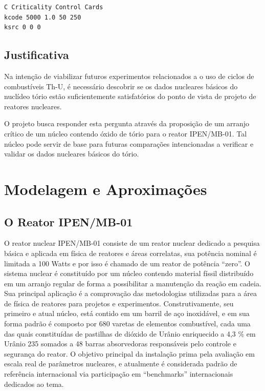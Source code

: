 \documentclass[
	12pt,				%
	openany,			%
	twoside,			%
	a4paper,			%
	english,			%
	french,				%
	spanish,			%
	brazil				%
	]{abntex2}
\begin{document}
\begin{lstlisting}
C Criticality Control Cards  
kcode 5000 1.0 50 250  
ksrc 0 0 0
\end{lstlisting}

\newpage
\section{Justificativa}

Na intenção de viabilizar futuros experimentos relacionados a o uso de ciclos de combustíveis Th-U, é necessário descobrir se os dados nucleares básicos do nuclídeo tório estão suficientemente satisfatórios do ponto de vista de projeto de reatores nucleares.

O projeto busca responder esta pergunta através da proposição de um arranjo crítico de um núcleo contendo óxido de tório para o reator IPEN/MB-01. Tal núcleo pode servir de base para futuras comparações intencionadas a verificar e validar os dados nucleares básicos do tório.



\chapter{Modelagem e Aproximações}

\section{O Reator IPEN/MB-01}

O reator nuclear IPEN/MB-01\cite{1reator} consiste de um reator nuclear dedicado
a pesquisa básica e aplicada em física de reatores e áreas correlatas,
sua potência nominal é limitada a 100 Watts e por isso é chamado de
um reator de potência \textquotedblleft zero\textquotedblright . O
sistema nuclear é constituído por um núcleo contendo material físsil
distribuído em um arranjo regular de forma a possibilitar a manutenção
da reação em cadeia. Sua principal aplicação é a comprovação das metodologias
utilizadas para a área de física de reatores para projetos e experimentos.
Construtivamente, seu primeiro e atual núcleo, está contido em um
barril de aço inoxidável, e em sua forma padrão é composto por 680
varetas de elementos combustível, cada uma das quais constituídas
de pastilhas de dióxido de Urânio enriquecido a 4,3 \% em Urânio 235
somados a 48 barras absorvedoras responsáveis pelo controle e segurança
do reator. O objetivo principal da instalação prima pela avaliação
em escala real de parâmetros nucleares, e atualmente é considerada
padrão de referência internacional via participação em \textquotedblleft benchmarks\textquotedblright \cite{2handbook}\cite{3international} internacionais dedicados ao tema.
\end{document}
